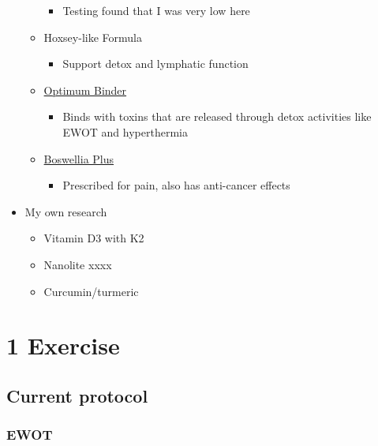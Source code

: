 \documentclass[
  letterpaper,
  DIV=11,
  numbers=noendperiod]{scrreprt}
\providecommand{\tightlist}{%
  \setlength{\itemsep}{0pt}\setlength{\parskip}{0pt}}\usepackage{longtable,booktabs,array}
\begin{document}
\begin{itemize}
\begin{itemize}
    \begin{itemize}
    \tightlist
    \item
      Testing found that I was very low here
    \end{itemize}
  \item
    Hoxsey-like Formula

    \begin{itemize}
    \tightlist
    \item
      Support detox and lymphatic function
    \end{itemize}
  \item
    \href{https://causenta.com/store/Optimum-Binder-p541360795}{Optimum
    Binder}

    \begin{itemize}
    \tightlist
    \item
      Binds with toxins that are released through detox activities like
      EWOT and hyperthermia
    \end{itemize}
  \item
    \href{https://causenta.com/store/Boswellia-Plus-Salicin-and-Boswellia-p109023254}{Boswellia
    Plus}

    \begin{itemize}
    \tightlist
    \item
      Prescribed for pain, also has anti-cancer effects
    \end{itemize}
  \end{itemize}
\item
  My own research

  \begin{itemize}
  \item
    Vitamin D3 with K2
  \item
    Nanolite xxxx
  \item
    Curcumin/turmeric
  \end{itemize}
\end{itemize}

\chapter{1 Exercise}\label{exercise}

\section{Current protocol}\label{current-protocol}

\subsection{EWOT}\label{ewot}
\end{document}
